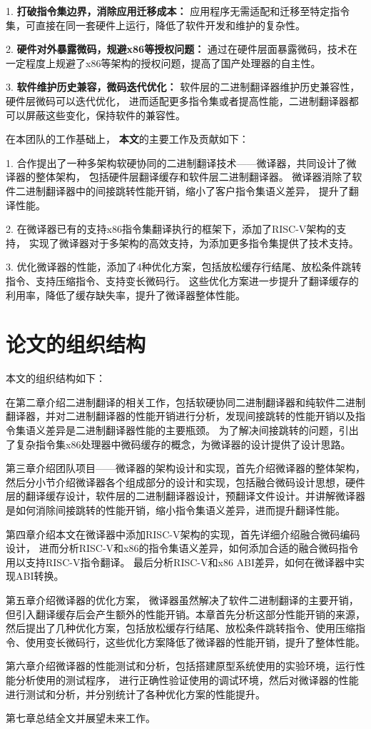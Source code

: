 1. \textbf{打破指令集边界，消除应用迁移成本：} 应用程序无需适配和迁移至特定指令集，可直接在同一套硬件上运行，降低了软件开发和维护的复杂性。

2. \textbf{硬件对外暴露微码，规避x86等授权问题：} 通过在硬件层面暴露微码，技术在一定程度上规避了x86等架构的授权问题，提高了国产处理器的自主性。

3. \textbf{软件维护历史兼容，微码迭代优化：} 软件层的二进制翻译器维护历史兼容性，硬件层微码可以迭代优化，
进而适配更多指令集或者提高性能，二进制翻译器都可以屏蔽这些变化，保持软件的兼容性。

在本团队的工作基础上，
\textbf{本文}的主要工作及贡献如下：

1. 合作提出了一种多架构软硬协同的二进制翻译技术——微译器，共同设计了微译器的整体架构，
包括硬件层翻译缓存和软件层二进制翻译器。
微译器消除了软件二进制翻译器中的间接跳转性能开销，缩小了客户指令集语义差异，
提升了翻译性能。

2. 在微译器已有的支持x86指令集翻译执行的框架下，添加了RISC-V架构的支持，
实现了微译器对于多架构的高效支持，为添加更多指令集提供了技术支持。

3. 优化微译器的性能，添加了4种优化方案，包括放松缓存行结尾、放松条件跳转指令、支持压缩指令、支持变长微码行。
这些优化方案进一步提升了翻译缓存的利用率，降低了缓存缺失率，提升了微译器整体性能。


\section{论文的组织结构}

本文的组织结构如下：

在第二章介绍二进制翻译的相关工作，包括软硬协同二进制翻译器和纯软件二进制翻译器，并对二进制翻译器的性能开销进行分析，发现间接跳转的性能开销以及指令集语义差异是二进制翻译器性能的主要瓶颈。
为了解决间接跳转的问题，引出了复杂指令集x86处理器中微码缓存的概念，为微译器的设计提供了设计思路。

第三章介绍团队项目——微译器的架构设计和实现，首先介绍微译器的整体架构，
然后分小节介绍微译器各个组成部分的设计和实现，包括融合微码设计思想，硬件层的翻译缓存设计，软件层的二进制翻译器设计，预翻译文件设计。并讲解微译器是如何消除间接跳转的性能开销，缩小指令集语义差异，进而提升翻译性能。

第四章介绍本文在微译器中添加RISC-V架构的实现，首先详细介绍融合微码编码设计，
进而分析RISC-V和x86的指令集语义差异，如何添加合适的融合微码指令用以支持RISC-V指令翻译。
最后分析RISC-V和x86 ABI差异，如何在微译器中实现ABI转换。

第五章介绍微译器的优化方案，
微译器虽然解决了软件二进制翻译的主要开销，但引入翻译缓存后会产生额外的性能开销。本章首先分析这部分性能开销的来源，然后提出了几种优化方案，包括放松缓存行结尾、放松条件跳转指令、使用压缩指令、使用变长微码行，这些优化方案降低了微译器的性能开销，提升了整体性能。

第六章介绍微译器的性能测试和分析，包括搭建原型系统使用的实验环境，运行性能分析使用的测试程序，
进行正确性验证使用的调试环境，然后对微译器的性能进行测试和分析，并分别统计了各种优化方案的性能提升。

第七章总结全文并展望未来工作。
